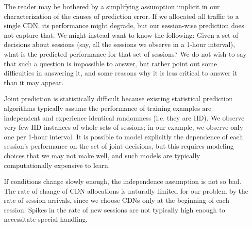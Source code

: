 
The reader may be bothered by a simplifying assumption implicit in our characterization of the causes of prediction error.  If we allocated all traffic to a single CDN, its performance might degrade, but our session-wise prediction does not capture that.  We might instead want to know the following: Given a set of decisions about sessions (say, all the sessions we observe in a 1-hour interval), what is the predicted performance for that set of sessions?  We do not wish to say that such a question is impossible to answer, but rather point out some difficulties in answering it, and some reasons why it is less critical to answer it than it may appear.

Joint prediction is statistically difficult because existing statistical prediction algorithms typically assume the performance of training examples are independent and experience identical randomness (i.e. they are IID).  We observe very few IID instances of whole sets of sessions; in our example, we observe only one per 1-hour interval.  It is possible to model explicitly the dependence of each session’s performance on the set of joint decisions, but this requires modeling choices that we may not make well, and such models are typically computationally expensive to learn. \fillme

If conditions change slowly enough, the independence assumption is not so bad.
The rate of change of CDN allocations is naturally limited for our problem by the rate of session arrivals, since we choose CDNs only at the beginning of each session.  Spikes in the rate of new sessions are not typically high enough to necessitate special handling.  

